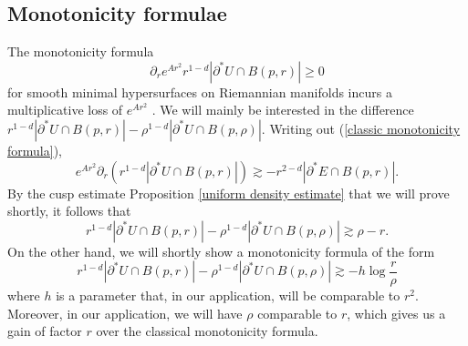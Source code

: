\documentclass[reqno,12pt,letterpaper]{amsart}
\theoremstyle{definition}
\numberwithin{equation}{section}
\begin{document}

\subsection{Monotonicity formulae}\label{inequalities}
The monotonicity formula
\begin{equation}\label{classic monotonicity formula}
\partial_r e^{Ar^2}r^{1 - d} |\partial^* U \cap B(p, r)| \geq 0
\end{equation}
for smooth minimal hypersurfaces on Riemannian manifolds incurs a multiplicative loss of $e^{Ar^2}$ \cite[\S7]{MarquesXX}.
We will mainly be interested in the difference $r^{1-d} |\partial^* U \cap B(p, r)| - \rho^{1-d} |\partial^* U \cap B(p, \rho)|$.
Writing out (\ref{classic monotonicity formula}),
$$e^{Ar^2}\partial_r(r^{1 - d} |\partial^* U \cap B(p, r)|) \gtrsim -r^{2 - d} |\partial^* E \cap B(p, r)|.$$
By the cusp estimate Proposition \ref{uniform density estimate} that we will prove shortly, it follows that
$$r^{1-d} |\partial^* U \cap B(p, r)| - \rho^{1-d} |\partial^* U \cap B(p, \rho)| \gtrsim \rho - r.$$
On the other hand, we will shortly show a monotonicity formula of the form
$$r^{1-d} |\partial^* U \cap B(p, r)| - \rho^{1-d} |\partial^* U \cap B(p, \rho)| \gtrsim -h \log \frac{r}{\rho}$$
where $h$ is a parameter that, in our application, will be comparable to $r^2$.
Moreover, in our application, we will have $\rho$ comparable to $r$, which gives us a gain of factor $r$ over the classical monotonicity formula.
\end{document}
